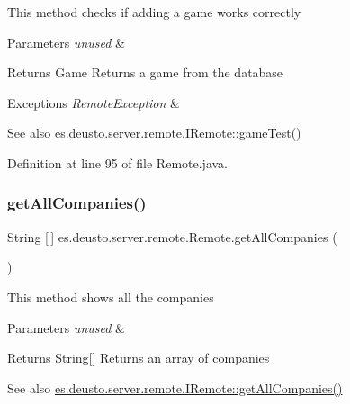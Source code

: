 This method checks if adding a game works correctly 
\begin{DoxyParams}{Parameters}
{\em unused} & \\
\hline
\end{DoxyParams}
\begin{DoxyReturn}{Returns}
Game Returns a game from the database 
\end{DoxyReturn}

\begin{DoxyExceptions}{Exceptions}
{\em Remote\+Exception} & \\
\hline
\end{DoxyExceptions}
\begin{DoxySeeAlso}{See also}
es.\+deusto.\+server.\+remote.\+I\+Remote\+::game\+Test() 
\end{DoxySeeAlso}


Definition at line 95 of file Remote.\+java.

\mbox{\label{classes_1_1deusto_1_1server_1_1remote_1_1_remote_ab8595d6689604ef57f2d01309936ccd2}} 
\subsubsection{\texorpdfstring{get\+All\+Companies()}{getAllCompanies()}}
{\footnotesize\ttfamily String \mbox{[}$\,$\mbox{]} es.\+deusto.\+server.\+remote.\+Remote.\+get\+All\+Companies (\begin{DoxyParamCaption}{ }\end{DoxyParamCaption})}

This method shows all the companies 
\begin{DoxyParams}{Parameters}
{\em unused} & \\
\hline
\end{DoxyParams}
\begin{DoxyReturn}{Returns}
String\mbox{[}\mbox{]} Returns an array of companies 
\end{DoxyReturn}
\begin{DoxySeeAlso}{See also}
\hyperlink{interfacees_1_1deusto_1_1server_1_1remote_1_1_i_remote_a43ab8347d64e5d49093e607029f2598b}{es.\+deusto.\+server.\+remote.\+I\+Remote\+::get\+All\+Companies()} 
\end{DoxySeeAlso}


